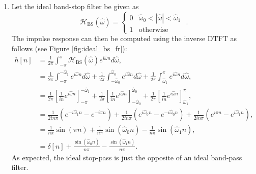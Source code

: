 \begin{enumerate}
\item Let the ideal band-stop filter be given as
\begin{equation*}
\mathcal{H}_{\mathrm{BS}}(\hat{\omega}) = \left\{ \begin{array}{cc}
0 & \hat{\omega}_0 < |\hat{\omega}| < \hat{\omega}_1 \\
1 & \mathrm{otherwise}
\end{array}\right.\,\,.
\end{equation*}
The impulse response can then be computed using the inverse DTFT as follows (see Figure \ref{fig:ideal_bs_fr}):
\begin{align*}
    h[n]&=\frac{1}{2\pi}\int_{-\pi}^{\pi}\mathcal{H}_{\mathrm{BS}}(\hat{\omega})e^{i\hat{\omega}n}d\hat{\omega}, \\
    &=\frac{1}{2\pi}\int_{-\pi}^{-\hat{\omega}_{1}}e^{i\hat{\omega}n}d\hat{\omega} + \frac{1}{2\pi}\int_{-\hat{\omega}_{0}}^{\hat{\omega}_{0}}e^{i\hat{\omega}n}d\hat{\omega} + \frac{1}{2\pi}\int_{\hat{\omega}_{1}}^{\pi}e^{i\hat{\omega}n}d\hat{\omega}, \\
    &=\frac{1}{2\pi}\left[\frac{1}{in}e^{i\hat{\omega}n}\right]_{-\pi}^{-\hat{\omega}_{1}} + \frac{1}{2\pi}\left[\frac{1}{in}e^{i\hat{\omega}n}\right]_{-\hat{\omega}_{0}}^{\hat{\omega}_{0}} + \frac{1}{2\pi}\left[\frac{1}{in}e^{i\hat{\omega}n}\right]_{\hat{\omega}_{1}}^{\pi}, \\
    &=\frac{1}{2in\pi}\left(e^{-i\hat{\omega}_{1}n}-e^{-i\pi n}\right) + \frac{1}{2in\pi}\left(e^{i\hat{\omega}_{0}n}-e^{-i\hat{\omega}_{0}n}\right) + \frac{1}{2in\pi}\left(e^{i\pi n}-e^{i\hat{\omega}_{1}n}\right), \\
    &=\frac{1}{n\pi}\sin(\pi n) + \frac{1}{n\pi}\sin(\hat{\omega}_{0}n) - \frac{1}{n\pi}\sin(\hat{\omega}_{1}n), \\
    &=\delta[n] + \frac{\sin(\hat{\omega}_{0}n)}{n\pi} - \frac{\sin(\hat{\omega}_{1}n)}{n\pi}.
\end{align*}
As expected, the ideal stop-pass is just the opposite of an ideal band-pass filter. 



\end{enumerate}